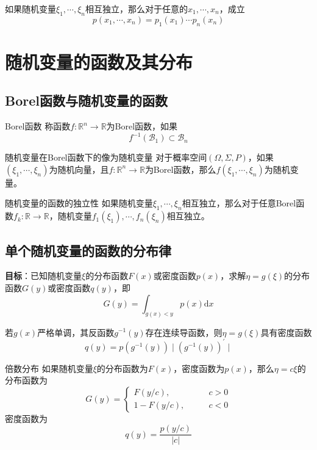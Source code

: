 \documentclass[lang = cn, scheme = chinese, thmcnt = section]{elegantbook}
\newcommand{\R}{\mathbb{R}}            %
\newcommand{\sub}{\subset}             %
\begin{document}
\begin{corollary}
	如果随机变量$\xi_1,\cdots,\xi_n$相互独立，那么对于任意的$x_1,\cdots,x_n$，成立%
	$$
	p(x_1,\cdots,x_n)=p_1(x_1)\cdots p_n(x_n)
	$$
\end{corollary}

\section{随机变量的函数及其分布}

\subsection{Borel函数与随机变量的函数}

\begin{definition}{Borel函数}
	称函数$f:\R^n\to\R$为Borel函数，如果%
	$$
	f^{-1}(\mathscr{B}_1)\sub \mathscr{B}_n
	$$
\end{definition}

\begin{proposition}{随机变量在Borel函数下的像为随机变量}
	对于概率空间$(\Omega,\Sigma,P)$，如果$(\xi_1,\cdots,\xi_n)$为随机向量，且$f:\R^n\to\R$为Borel函数，那么$f(\xi_1,\cdots,\xi_n)$为随机变量。
\end{proposition}

\begin{theorem}{随机变量的函数的独立性}
	如果随机变量$\xi_1,\cdots,\xi_n$相互独立，那么对于任意Borel函数$f_k:\R\to\R$，随机变量$f_1(\xi_1),\cdots,f_n(\xi_n)$相互独立。
\end{theorem}

\subsection{单个随机变量的函数的分布律}

\textbf{目标}：已知随机变量$\xi$的分布函数$F(x)$或密度函数$p(x)$，求解$\eta=g(\xi)$的分布函数$G(y)$或密度函数$q(y)$，即
$$
G(y)=\int_{g(x)<y}{p(x)\mathrm{d}x}
$$

\begin{proposition}
	若$g(x)$严格单调，其反函数$g^{-1}(y)$存在连续导函数，则$\eta=g(\xi)$具有密度函数
	$$
	q(y)=p(g^{-1}(y)) \mid (g^{-1}(y))^{\prime} \mid 
	$$
\end{proposition}

\begin{proposition}{倍数分布}
	如果随机变量$\xi$的分布函数为$F(x)$，密度函数为$p(x)$，那么$\eta=c\xi$的分布函数为
	$$
	G(y)=\begin{cases}
		F(y/c),&\qquad c>0\\
		1-F(y/c),&\qquad c<0
	\end{cases}
	$$
	密度函数为
	$$
	q(y)=\frac{p(y/c)}{|c|}
	$$
\end{proposition}
\end{document}
